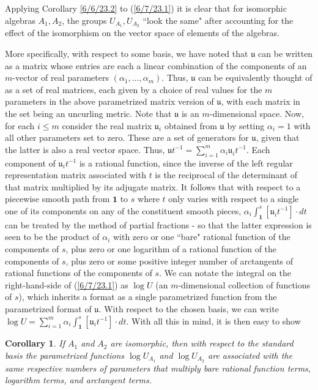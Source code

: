 \documentclass{amsart}
\numberwithin{equation}{section}
\newtheorem{corollary}[theorem]{Corollary}
\theoremstyle{definition}
\numberwithin{theorem}{section}
\begin{document}
Applying Corollary \ref{6/6/23.2} to (\ref{6/7/23.1}) it is clear that for isomorphic algebras $A_1,A_2$, the groups $ U_{A_1},  U_{A_2}$ ``look the same" after accounting for the effect of the isomorphism on the vector space of elements of the algebras.

More specifically, with respect to some basis, we have noted that $\mathfrak{u}$ can be written as a matrix whose entries are each a linear combination of the components of an $m$-vector of real parameters $(\alpha_1, \dots, \alpha_m)$.   Thus, $\mathfrak{u}$ can be equivalently thought of as a set of real matrices, each given by a choice of real values for the $m$ parameters in the above parametrized matrix version of $\mathfrak{u}$, with each matrix in the set being an uncurling metric.   Note that $\mathfrak{u}$ is an $m$-dimensional space.    Now, for each $i\le m$ consider the real matrix  $\mathfrak{u}_i$ obtained from $\mathfrak{u}$ by setting $\alpha_i =1$ with all other parameters set to zero.  These are a set of generators for $\mathfrak{u}$, given that the latter is also a real vector space. Thus, $\mathfrak{u}t^{-1} = \sum_{i=1}^m \alpha_i \mathfrak{u}_i t^{-1}$.   Each component of $\mathfrak{u}_i t^{-1}$ is a rational function, since the inverse of the left regular representation matrix associated with $t$ is the reciprocal of the determinant of that matrix multiplied by its adjugate matrix.  It follows that  with respect to a piecewise smooth path from $\mathbf{1}$ to $s$ where $t$ only varies with respect to a single one of its components on any of the constituent smooth pieces, $\alpha_i \int_{\mathbf{1}}^s [\mathfrak{u}_i t^{-1}]\cdot dt$ can be treated by the method of partial fractions - so that the latter expression is seen to be the product of $\alpha_i$ with zero or one ``bare" rational function of the components of $s$, plus zero or one logarithm of a rational function of the components of $s$, plus zero or some positive integer number of arctangents of rational functions of the components of $s$.  We can notate the integral on the right-hand-side of (\ref{6/7/23.1}) as $\log  U$ (an $m$-dimensional collection of functions of $s$), which inherits a format as a single parametrized function from the parametrized format of $\mathfrak{u}$.  With respect to the chosen basis, we can write $\log  U =\sum_{i=1}^m \alpha_i \int_{\mathbf{1}}^s [\mathfrak{u}_i t^{-1}]\cdot dt$.  With all this in mind, it is then easy to show

\begin{corollary} \label{6/6/23.3} If $A_1$ and $A_2$ are isomorphic, then with respect to the standard basis the parametrized functions $\log U_{A_1}$ and $\log U_{A_2}$ are associated with the same respective numbers of parameters that multiply bare rational function terms, logarithm terms, and arctangent terms.
\end{corollary}
\end{document}
